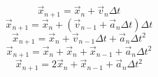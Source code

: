 \documentclass[12pt]{article}
\begin{document}
\[ \Vec{x}_{n+1} = \Vec{x}_{n} +  \Vec{v}_{n} \Delta t \]
\[ \Vec{x}_{n+1} = \Vec{x}_{n} +  (\Vec{v}_{n-1} + \Vec{a}_{n} \Delta t)\Delta t \]
\[ \Vec{x}_{n+1} = \Vec{x}_{n} +  \Vec{v}_{n-1}\Delta t + \Vec{a}_{n} \Delta t^2 \]
\[ \Vec{x}_{n+1} = \Vec{x}_{n} +  \Vec{x}_{n} + \Vec{x}_{n-1} + \Vec{a}_{n} \Delta t^2 \]
\[ \Vec{x}_{n+1} = 2\Vec{x}_{n} + \Vec{x}_{n-1} + \Vec{a}_{n} \Delta t^2 \]
\end{document}
